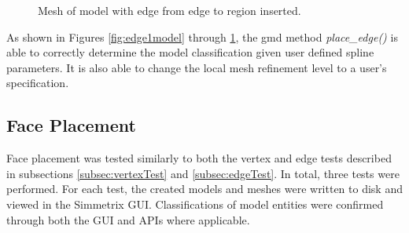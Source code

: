\documentclass[a4paper, 12pt]{article}
\begin{document}
\begin{figure}[H]
  \centering
  \caption{Mesh of model with edge from edge to region inserted.}
  \label{fig:edge4mesh}
\end{figure}

As shown in Figures \ref{fig:edge1model} through \ref{fig:edge4mesh}, 
the gmd method \emph{place\_edge()} is able to correctly determine 
the model classification given user defined spline parameters. It is also 
able to change the local mesh refinement level to a user's specification. 

\subsection{Face Placement} \label{subsec:faceTest}
Face placement was tested similarly to both the vertex and edge
tests described in subsections \ref{subsec:vertexTest} and \ref{subsec:edgeTest}.
In total, three tests were performed. For each test, the created 
models and meshes were written to disk and viewed in the Simmetrix GUI.
Classifications of model entities were confirmed through both the GUI and 
APIs where applicable.
\end{document}
